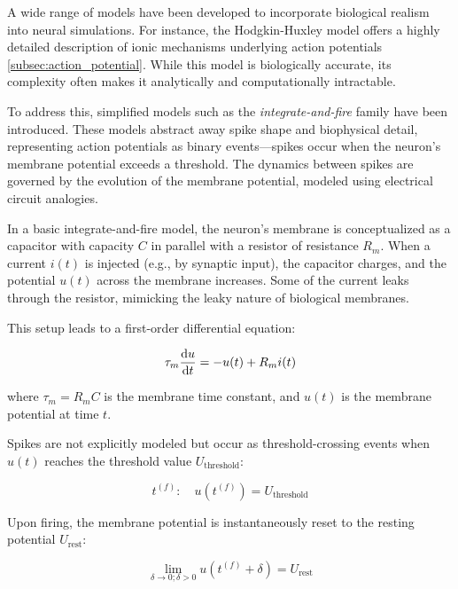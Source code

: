 A wide range of models have been developed to incorporate biological realism into neural simulations. For instance, the Hodgkin-Huxley model \citep{hodgkin1952quantitative} offers a highly detailed description of ionic mechanisms underlying action potentials \ref{subsec:action_potential}. While this model is biologically accurate, its complexity often makes it analytically and computationally intractable.

To address this, simplified models such as the \emph{integrate-and-fire} family have been introduced. These models abstract away spike shape and biophysical detail, representing action potentials as binary events—spikes occur when the neuron's membrane potential exceeds a threshold. The dynamics between spikes are governed by the evolution of the membrane potential, modeled using electrical circuit analogies.

In a basic integrate-and-fire model, the neuron's membrane is conceptualized as a capacitor with capacity $C$ in parallel with a resistor of resistance $R_m$. When a current $i(t)$ is injected (e.g., by synaptic input), the capacitor charges, and the potential $u(t)$ across the membrane increases. Some of the current leaks through the resistor, mimicking the leaky nature of biological membranes.

This setup leads to a first-order differential equation:


\begin{equation}
    \tau_{m} \odv{u}{t} = -u(t) + R_{m}i(t)
\end{equation}
\label{eq:integrate_and_fire}

where $\tau_m = R_m C$ is the membrane time constant, and $u(t)$ is the membrane potential at time $t$.

Spikes are not explicitly modeled but occur as threshold-crossing events when $u(t)$ reaches the threshold value $U_{\text{threshold}}$:

\begin{equation}
    t^{(f)}: \quad u(t^{(f)}) = U_{\text{threshold}}
\end{equation}
\label{eq:firing_time}

Upon firing, the membrane potential is instantaneously reset to the resting potential $U_{\text{rest}}$:

\begin{equation}
    \lim_{\delta \to 0; \delta > 0} u\left( t^{(f)} + \delta \right) = U_{\text{rest}}
\end{equation}
\label{eq:resting_potential}

